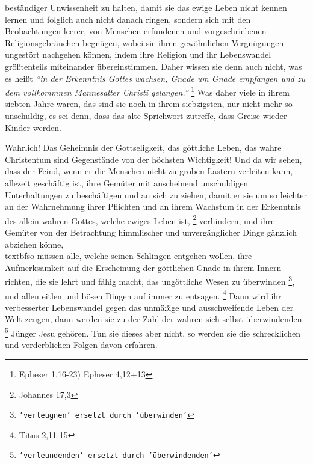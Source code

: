 {beständiger Unwissenheit zu halten, damit sie das ewige Leben nicht kennen
lernen und folglich auch nicht danach ringen, sondern sich mit den
Beobachtungen leerer, von Menschen erfundenen und vorgeschriebenen
Religionsgebräuchen begnügen, wobei sie ihren gewöhnlichen Vergnügungen
ungestört nachgehen können, indem ihre Religion und ihr Lebenswandel
größtenteils miteinander übereinstimmen. Daher wissen sie denn auch nicht, was
es heißt
\textit{"`in der Erkenntnis Gottes wachsen, Gnade um Gnade empfangen und zu
dem vollkommnen Mannesalter Christi gelangen."'}
\footnote{Epheser 1,16-23) Epheser 4,12+13}
Was daher viele in ihrem siebten Jahre waren, das sind sie noch in
ihrem siebzigsten, nur nicht mehr so unschuldig, es sei denn, dass das alte
Sprichwort zutreffe, dass Greise wieder Kinder werden.

\medskip

Wahrlich! Das Geheimnis der Gottseligkeit, das göttliche
Leben, das wahre
Christentum sind Gegenstände von der höchsten Wichtigkeit! Und da wir sehen,
dass der Feind, wenn er die Menschen nicht zu groben Lastern verleiten kann,
allezeit geschäftig ist, ihre Gemüter mit anscheinend unschuldigen
Unterhaltungen zu beschäftigen und an sich zu ziehen, damit er sie um so
leichter an der Wahrnehmung ihrer Pflichten und an ihrem Wachstum in der
Erkenntnis des allein wahren Gottes, welche ewiges Leben ist,
\footnote{Johannes 17,3}
verhindern, und ihre Gemüter von der Betrachtung himmlischer und
unvergänglicher Dinge gänzlich abziehen könne,\\textbf{so müssen alle, welche
seinen
Schlingen entgehen wollen, ihre Aufmerksamkeit auf die Erscheinung der
göttlichen Gnade in ihrem Innern richten, die sie lehrt und fähig
macht, das
ungöttliche Wesen zu überwinden
\footnote{\texttt{'verleugnen' ersetzt durch 'überwinden'}}, und allen eitlen
und bösen Dingen auf immer zu
entsagen.}
\footnote{Titus 2,11-15}
Dann wird ihr verbesserter Lebenswandel gegen
das unmäßige und ausschweifende Leben der Welt zeugen, dann werden sie zu der
Zahl der wahren sich selbst überwindenden
\footnote{\texttt{'verleundenden' ersetzt durch 'überwindenden'}} Jünger Jesu
gehören. Tun sie dieses
aber nicht, so werden sie die schrecklichen und verderblichen Folgen davon
erfahren.

\medskip

}
